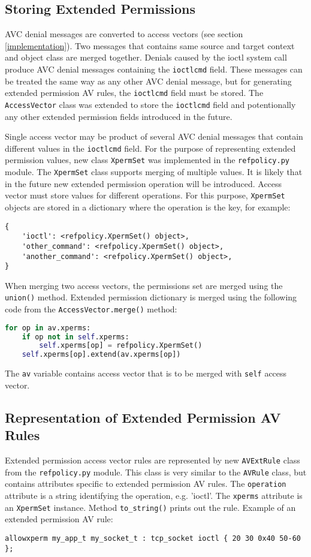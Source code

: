 \subsection{Storing Extended Permissions}
AVC denial messages are converted to access vectors (see section
\ref{implementation}). Two messages that contains same source and target context
and object class are merged together. Denials caused by the ioctl system call
produce AVC denial messages containing the \texttt{ioctlcmd} field. These
messages can be treated the same way as any other AVC denial message, but for
generating extended permission AV rules, the \texttt{ioctlcmd} field must be
stored. The \texttt{AccessVector} class was extended to store the
\texttt{ioctlcmd} field and potentionally any other extended permission fields
introduced in the future.

Single access vector may be product of several AVC denial messages that contain
different values in the \texttt{ioctlcmd} field. For the purpose of representing
extended permission values, new class \texttt{XpermSet} was implemented in the
\texttt{refpolicy.py} module. The \texttt{XpermSet} class supports merging of
multiple values. It is likely that in the future new extended permission
operation will be introduced. Access vector must store values for different
operations. For this purpose, \texttt{XpermSet} objects are stored in a
dictionary where the operation is the key, for example:
\begin{lstlisting}
{
    'ioctl': <refpolicy.XpermSet() object>,
    'other_command': <refpolicy.XpermSet() object>,
    'another_command': <refpolicy.XpermSet() object>,
}
\end{lstlisting}

When merging two access vectors, the permissions set are merged using the
\texttt{union()} method. Extended permission dictionary is merged using the
following code from the \texttt{AccessVector.merge()} method:
\begin{lstlisting}[language=Python]
for op in av.xperms:
    if op not in self.xperms:
        self.xperms[op] = refpolicy.XpermSet()
    self.xperms[op].extend(av.xperms[op])
\end{lstlisting}
The \texttt{av} variable contains access vector that is to be merged with
\texttt{self} access vector.

\subsection{Representation of Extended Permission AV Rules}
Extended permission access vector rules are represented by new
\texttt{AVExtRule} class from the \texttt{refpolicy.py} module. This class is
very similar to the \texttt{AVRule} class, but contains attributes specific to
extended permission AV rules. The \texttt{operation} attribute is a string
identifying the operation, e.g. 'ioctl'. The \texttt{xperms} attribute is an
\texttt{XpermSet} instance. Method \texttt{to\_string()} prints out the rule.
Example of an extended permission AV rule:
\begin{lstlisting}
allowxperm my_app_t my_socket_t : tcp_socket ioctl { 20 30 0x40 50-60 };
\end{lstlisting}

